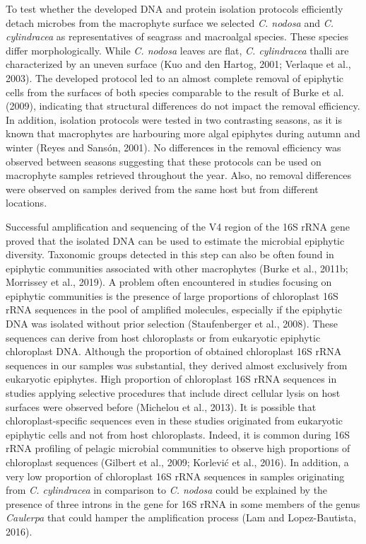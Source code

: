 \documentclass[12pt,]{article}
\begin{document}
To test whether the developed DNA and protein isolation protocols
efficiently detach microbes from the macrophyte surface we selected
\emph{C. nodosa} and \emph{C. cylindracea} as representatives of
seagrass and macroalgal species. These species differ morphologically.
While \emph{C. nodosa} leaves are flat, \emph{C. cylindracea} thalli are
characterized by an uneven surface (Kuo and den Hartog, 2001; Verlaque
et al., 2003). The developed protocol led to an almost complete removal
of epiphytic cells from the surfaces of both species comparable to the
result of Burke et al. (2009), indicating that structural differences do
not impact the removal efficiency. In addition, isolation protocols were
tested in two contrasting seasons, as it is known that macrophytes are
harbouring more algal epiphytes during autumn and winter (Reyes and
Sansón, 2001). No differences in the removal efficiency was observed
between seasons suggesting that these protocols can be used on
macrophyte samples retrieved throughout the year. Also, no removal
differences were observed on samples derived from the same host but from
different locations.

Successful amplification and sequencing of the V4 region of the 16S rRNA
gene proved that the isolated DNA can be used to estimate the microbial
epiphytic diversity. Taxonomic groups detected in this step can also be
often found in epiphytic communities associated with other macrophytes
(Burke et al., 2011b; Morrissey et al., 2019). A problem often
encountered in studies focusing on epiphytic communities is the presence
of large proportions of chloroplast 16S rRNA sequences in the pool of
amplified molecules, especially if the epiphytic DNA was isolated
without prior selection (Staufenberger et al., 2008). These sequences
can derive from host chloroplasts or from eukaryotic epiphytic
chloroplast DNA. Although the proportion of obtained chloroplast 16S
rRNA sequences in our samples was substantial, they derived almost
exclusively from eukaryotic epiphytes. High proportion of chloroplast
16S rRNA sequences in studies applying selective procedures that include
direct cellular lysis on host surfaces were observed before (Michelou et
al., 2013). It is possible that chloroplast-specific sequences even in
these studies originated from eukaryotic epiphytic cells and not from
host chloroplasts. Indeed, it is common during 16S rRNA profiling of
pelagic microbial communities to observe high proportions of chloroplast
sequences (Gilbert et al., 2009; Korlević et al., 2016). In addition, a
very low proportion of chloroplast 16S rRNA sequences in samples
originating from \emph{C. cylindracea} in comparison to \emph{C. nodosa}
could be explained by the presence of three introns in the gene for 16S
rRNA in some members of the genus \emph{Caulerpa} that could hamper the
amplification process (Lam and Lopez-Bautista, 2016).
\end{document}
